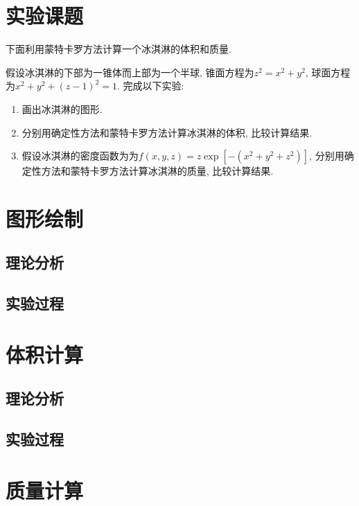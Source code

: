 \documentclass[a4paper,12pt]{article}
\begin{document}
\begin{CJK*}{UTF8}{gbsn}



\section{实验课题}
下面利用蒙特卡罗方法计算一个冰淇淋的体积和质量.\par
假设冰淇淋的下部为一锥体而上部为一个半球, 锥面方程为$z^2=x^2+y^2$, 球面方程为$x^2+y^2+(z-1)^2=1$. 完成以下实验:\par 
\begin{enumerate}
\item 画出冰淇淋的图形.
\item 分别用确定性方法和蒙特卡罗方法计算冰淇淋的体积, 比较计算结果.
\item 假设冰淇淋的密度函数为为$f(x,y,z)=z\exp{[-(x^2+y^2+z^2)]}$, 分别用确定性方法和蒙特卡罗方法计算冰淇淋的质量, 比较计算结果.
\end{enumerate}



\section{图形绘制}

\subsection{理论分析}

\subsection{实验过程}




\section{体积计算}

\subsection{理论分析}

\subsection{实验过程}




\section{质量计算}



\end{CJK*}
\end{document}

